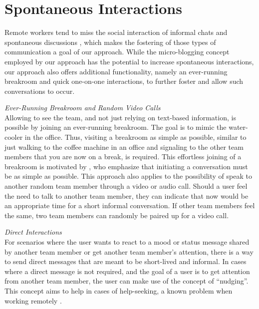 \section{Spontaneous Interactions}
Remote workers tend to miss the social interaction of informal chats and spontaneous discussions \autocite{cooper2002telecommuting}, which makes the fostering of those types of communication a goal of our approach. While the micro-blogging concept employed by our approach has the potential to increase spontaneous interactions, our approach also offers additional functionality, namely an ever-running breakroom and quick one-on-one interactions, to further foster and allow such conversations to occur.

\medskip\noindent\textit{Ever-Running Breakroom and Random Video Calls} \\
Allowing to see the team, and not just relying on text-based information, is possible by joining an ever-running breakroom. The goal is to mimic the water-cooler in the office. Thus, visiting a breakroom as simple as possible, similar to just walking to the coffee machine in an office and signaling to the other team members that you are now on a break, is required. This effortless joining of a breakroom is motivated by \textcite{chang2007out}, who emphasize that initiating a conversation must be as simple as possible. This approach also applies to the possibility of speak to another random team member through a video or audio call. Should a user feel the need to talk to another team member, they can indicate that now would be an appropriate time for a short informal conversation. If other team members feel the same, two team members can randomly be paired up for a video call.

\medskip\noindent\textit{Direct Interactions} \\
For scenarios where the user wants to react to a mood or status message shared by another team member or get another team member's attention, there is a way to send direct messages that are meant to be short-lived and informal. In cases where a direct message is not required, and the goal of a user is to get attention from another team member, the user can make use of the concept of \enquote{nudging}. This concept aims to help in cases of help-seeking, a known problem when working remotely \autocite{herbsleb2003empirical}.
